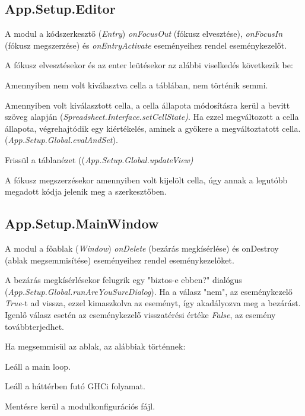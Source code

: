\subsection{App.Setup.Editor}

A modul a kódszerkesztő (\textit{Entry}) \textit{onFocusOut} (fókusz elvesztése), \textit{onFocusIn} (fókusz megszerzése) és \textit{onEntryActivate} eseményeihez rendel eseménykezelőt.

A fókusz elvesztésekor és az enter leütésekor az alábbi viselkedés következik be:
\begin{compactenum}
	\item Amennyiben nem volt kiválasztva cella a táblában, nem történik semmi.
	\item Amennyiben volt kiválasztott cella, a cella állapota módosításra kerül a bevitt szöveg alapján (\mbox{\textit{Spreadsheet.Interface.setCellState)}}. Ha ezzel megváltozott a cella állapota, végrehajtódik egy kiértékelés, aminek a gyökere a megváltoztatott cella. (\mbox{\textit{App.Setup.Global.evalAndSet}}).
	\item Frissül a táblanézet ((\mbox{\textit{App.Setup.Global.updateView)}}
\end{compactenum}

A fókusz megszerzésekor amennyiben volt kijelölt cella, úgy annak a legutóbb megadott kódja jelenik meg a szerkesztőben.

\subsection{App.Setup.MainWindow}

A modul a főablak (\textit{Window}) \textit{onDelete} (bezárás megkísérlése) és onDestroy (ablak megsemmisítése) eseményeihez rendel eseménykezelőket.

A bezárás megkísérlésekor felugrik egy "biztos-e ebben?" dialógus \mbox{(\textit{App.Setup.Global.runAreYouSureDialog})}. Ha a válasz "nem", az eseménykezelő \textit{True}-t ad vissza, ezzel kimaszkolva az eseményt, így akadályozva meg a bezárást. Igenlő válasz esetén az eseménykezelő visszatérési értéke \textit{False}, az esemény továbbterjedhet.

Ha megsemmisül az ablak, az alábbiak történnek:
\begin{compactenum}
	\item Leáll a main loop.
	\item Leáll a háttérben futó GHCi folyamat.
	\item Mentésre kerül a modulkonfigurációs fájl.
\end{compactenum}

